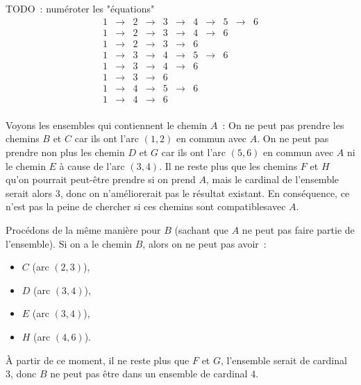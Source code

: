 \documentclass{article}
\begin{document}
TODO~: numéroter les "équations"
$$
\begin{array}{ccccccccccc}
  1 & \rightarrow & 2 & \rightarrow & 3 & \rightarrow & 4 & \rightarrow & 5 & \rightarrow & 6 \\
  1 & \rightarrow & 2 & \rightarrow & 3 & \rightarrow & 4 & \rightarrow & 6 &             &   \\
  1 & \rightarrow & 2 & \rightarrow & 3 & \rightarrow & 6 &             &   &             &   \\
  1 & \rightarrow & 3 & \rightarrow & 4 & \rightarrow & 5 & \rightarrow & 6 &             &   \\
  1 & \rightarrow & 3 & \rightarrow & 4 & \rightarrow & 6 &             &   &             &   \\
  1 & \rightarrow & 3 & \rightarrow & 6 &             &   &             &   &             &   \\
  1 & \rightarrow & 4 & \rightarrow & 5 & \rightarrow & 6 &             &   &             &   \\
  1 & \rightarrow & 4 & \rightarrow & 6 &             &   &             &   &             &   \\
\end{array}
$$

Voyons les ensembles qui contiennent le chemin $A$~: On ne peut pas
prendre les chemins $B$ et $C$ car ils ont l'arc $(1,2)$ en commun
avec $A$. On ne peut pas prendre non plus les chemin $D$ et $G$ car
ils ont l'arc $(5,6)$ en commun avec $A$ ni le chemin $E$ à cause de
l'arc $(3,4)$. Il ne reste plus que les chemins $F$ et $H$ qu'on
pourrait peut-être prendre si on prend $A$, mais le cardinal de
l'ensemble serait alors 3, donc on n'améliorerait pas le résultat
existant. En conséquence, ce n'est pas la peine de chercher si ces chemins
sont \og compatibles\fg avec $A$.

Procédons de la même manière pour $B$ (sachant que $A$ ne peut pas
faire partie de l'ensemble). Si on a le chemin $B$, alors on ne peut
pas avoir~:
\begin{itemize}
  \item $C$ (arc $(2,3)$),
  \item $D$ (arc $(3,4)$),
  \item $E$ (arc $(3,4)$),
  \item $H$ (arc $(4,6)$).
\end{itemize}
À partir de ce moment, il ne reste plus que $F$ et $G$, l'ensemble
serait de cardinal 3, donc $B$ ne peut pas être dans un ensemble de
cardinal 4.
\end{document}
